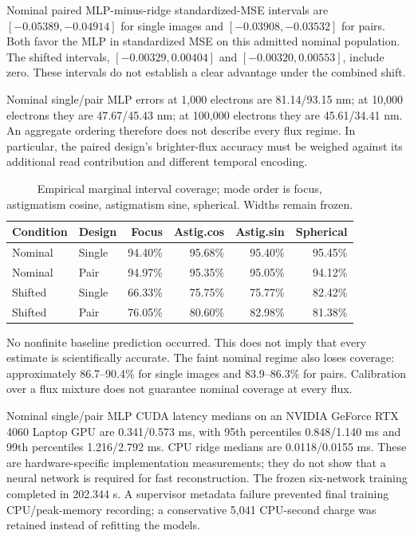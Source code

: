\documentclass[11pt,a4paper]{article}
\begin{document}
Nominal paired MLP-minus-ridge standardized-MSE intervals are
$[-0.05389,-0.04914]$ for single images and $[-0.03908,-0.03532]$ for pairs.
Both favor the MLP in standardized MSE on this admitted nominal population. The shifted intervals,
$[-0.00329,0.00404]$ and $[-0.00320,0.00553]$, include zero. These intervals do
not establish a clear advantage under the combined shift.

Nominal single/pair MLP errors at 1,000 electrons are 81.14/93.15 nm;
at 10,000 electrons they are 47.67/45.43 nm; at 100,000 electrons they are 45.61/34.41 nm.
An aggregate ordering therefore does not describe every flux regime. In
particular, the paired design's brighter-flux accuracy must be weighed against
its additional read contribution and different temporal encoding.

\begin{table}[ht]
\centering\small
\caption{Empirical marginal interval coverage; mode order is focus,
astigmatism cosine, astigmatism sine, spherical. Widths remain frozen.}
\begin{tabular}{@{}llrrrr@{}}
\toprule
Condition&Design&Focus&Astig.cos&Astig.sin&Spherical\\
\midrule
Nominal&Single&94.40\%&95.68\%&95.40\%&95.45\%\\
Nominal&Pair&94.97\%&95.35\%&95.05\%&94.12\%\\
Shifted&Single&66.33\%&75.75\%&75.77\%&82.42\%\\
Shifted&Pair&76.05\%&80.60\%&82.98\%&81.38\%\\
\bottomrule
\end{tabular}
\label{tab:coverage}
\end{table}

No nonfinite baseline prediction occurred. This does not imply that every
estimate is scientifically accurate. The faint nominal regime also loses
coverage: approximately 86.7--90.4\% for single images and 83.9--86.3\% for pairs.
Calibration over a flux mixture does not guarantee nominal coverage at every flux.

Nominal single/pair MLP CUDA latency medians on an NVIDIA GeForce RTX 4060 Laptop GPU are 0.341/0.573 ms, with 95th
percentiles 0.848/1.140 ms and 99th percentiles 1.216/2.792 ms. CPU ridge medians
are 0.0118/0.0155 ms. These are hardware-specific implementation measurements;
they do not show that a neural network is required for fast reconstruction.
The frozen six-network training completed in 202.344 s. A supervisor metadata
failure prevented final training CPU/peak-memory recording; a conservative
5,041 CPU-second charge was retained instead of refitting the models.
\end{document}
